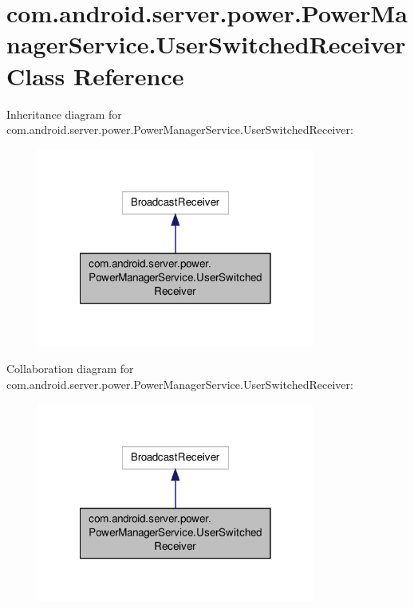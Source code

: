 \hypertarget{classcom_1_1android_1_1server_1_1power_1_1PowerManagerService_1_1UserSwitchedReceiver}{\section{com.\-android.\-server.\-power.\-Power\-Manager\-Service.\-User\-Switched\-Receiver Class Reference}
\label{classcom_1_1android_1_1server_1_1power_1_1PowerManagerService_1_1UserSwitchedReceiver}
}


Inheritance diagram for com.\-android.\-server.\-power.\-Power\-Manager\-Service.\-User\-Switched\-Receiver\-:
\nopagebreak
\begin{figure}[H]
\begin{center}
\leavevmode
\includegraphics[width=258pt]{classcom_1_1android_1_1server_1_1power_1_1PowerManagerService_1_1UserSwitchedReceiver__inherit__graph}
\end{center}
\end{figure}


Collaboration diagram for com.\-android.\-server.\-power.\-Power\-Manager\-Service.\-User\-Switched\-Receiver\-:
\nopagebreak
\begin{figure}[H]
\begin{center}
\leavevmode
\includegraphics[width=258pt]{classcom_1_1android_1_1server_1_1power_1_1PowerManagerService_1_1UserSwitchedReceiver__coll__graph}
\end{center}
\end{figure}
